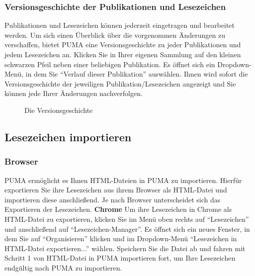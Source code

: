\subsubsection{Versionsgeschichte der Publikationen und Lesezeichen}
Publikationen und Lesezeichen können jederzeit eingetragen und bearbeitet werden. Um sich einen Überblick über die vorgenommen Änderungen zu verschaffen, bietet PUMA eine Versionsgeschichte zu jeder Publikationen und jedem Lesezeichen an. Klicken Sie in Ihrer eigenen Sammlung auf den kleinen schwarzen Pfeil neben einer beliebigen Publikation. Es öffnet sich ein Dropdown-Menü, in dem Sie \enquote{Verlauf dieser Publikation} auswählen. Ihnen wird sofort die Versionsgeschichte der jeweiligen Publikation/Lesezeichen angezeigt und Sie können jede Ihrer Änderungen nachverfolgen. 
\begin{figure}[h!]
 \centering
 \caption{Die Versionsgeschichte}
 \label{figure3}
\end{figure} 
\subsection{Lesezeichen importieren}
\subsubsection{Browser}
PUMA ermöglicht es Ihnen HTML-Dateien in PUMA zu importieren. Hierfür exportieren Sie ihre Lesezeichen aus ihrem Browser als HTML-Datei und importieren diese anschließend. Je nach Browser unterscheidet sich das Exportieren der Lesezeichen.
\newline
\newline
\textbf{Chrome}%
\newline Um ihre Lesezeichen in Chrome als HTML-Datei zu exportieren, klicken Sie im Menü oben rechts auf \enquote{Lesezeichen} und anschließend auf \enquote{Lesezeichen-Manager}. Es öffnet sich ein neues Fenster, in dem Sie auf \enquote{Organisieren} klicken und im Dropdown-Menü \enquote{Lesezeichen in HTML-Datei exportieren...} wählen. Speichern Sie die Datei ab und fahren mit Schritt 1 von HTML-Datei in PUMA importieren fort, um Ihre Lesezeichen endgültig nach PUMA zu importieren.  

